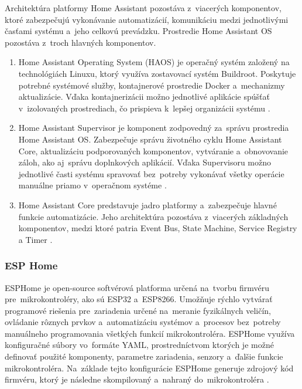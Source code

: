 Architektúra platformy Home Assistant pozostáva z~viacerých komponentov, 
ktoré zabezpečujú vykonávanie automatizácií, komunikáciu medzi 
jednotlivými časťami systému a~jeho celkovú prevádzku. 
Prostredie Home Assistant OS pozostáva z~troch hlavných komponentov. 
\begin{enumerate}
  \item Home Assistant Operating System (HAOS) je operačný systém 
  založený na technológiách Linuxu, ktorý využíva zostavovací 
  systém Buildroot. Poskytuje potrebné systémové služby, 
  kontajnerové prostredie Docker a~mechanizmy aktualizácie. 
  Vďaka kontajnerizácii možno jednotlivé aplikácie spúšťať v~izolovaných 
  prostrediach, čo prispieva k~lepšej organizácii systému \cite{haos}. 

  \item Home Assistant Supervisor je komponent zodpovedný za~správu 
  prostredia Home Assistant OS. Zabezpečuje správu životného cyklu 
  Home Assistant Core, aktualizáciu podporovaných komponentov, 
  vytváranie a~obnovovanie záloh, ako aj~správu doplnkových aplikácií. 
  Vďaka Supervisoru možno jednotlivé časti systému spravovať bez~potreby 
  vykonávať všetky operácie manuálne priamo v~operačnom 
  systéme \cite{supervisor_ha}. 

  \item Home Assistant Core predstavuje jadro platformy a~zabezpečuje 
  hlavné funkcie automatizácie. Jeho architektúra pozostáva z~viacerých 
  základných komponentov, medzi ktoré patria Event Bus, State Machine, 
  Service Registry a Timer \cite{core_ha}.

\end{enumerate}
\subsubsection{ESP Home}
ESPHome je open-source softvérová platforma určená na~tvorbu firmvéru 
pre~mikrokontroléry, ako sú ESP32 a~ESP8266. Umožňuje rýchlo vytvárať 
programové riešenia pre~zariadenia určené na~meranie fyzikálnych veličín, 
ovládanie rôznych prvkov a~automatizáciu systémov a~procesov bez~potreby 
manuálneho programovania všetkých funkcií mikrokontroléra. ESPHome 
využíva konfiguračné súbory vo~formáte YAML, prostredníctvom ktorých je 
možné definovať použité komponenty, parametre zariadenia, senzory 
a~ďalšie funkcie mikrokontroléra. Na~základe tejto konfigurácie 
ESPHome generuje zdrojový kód firmvéru, ktorý je následne skompilovaný 
a~nahraný do~mikrokontroléra \cite{esphome}.

